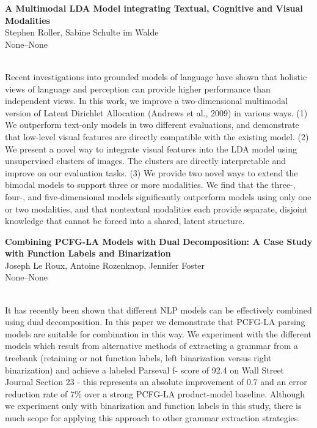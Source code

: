 \documentclass[twoside,makeidx]{book}
\renewcommand{\normalsize}{\fontsize{8}{9}\selectfont}
\renewcommand{\small}{\fontsize{7}{8}\selectfont}
\begin{document}
\par\vspace{2em}\noindent%
\begin{minipage}{\linewidth}%
\begin{center}
\textbf{\normalsize A Multimodal LDA Model integrating Textual, Cognitive and Visual Modalities}\\
\normalsize  Stephen Roller,  Sabine Schulte im Walde\\
{\small None--None}\\
\end{center}
\end{minipage}\\[0.5em]
\nopagebreak%
\noindent%
{\small Recent investigations into grounded models of language have shown that holistic views of language and perception can provide higher performance than independent views. In this work, we improve a two-dimensional multimodal version of Latent Dirichlet Allocation (Andrews et al., 2009) in various ways. (1) We outperform text-only models in two different evaluations, and demonstrate that low-level visual features are directly compatible with the existing model. (2) We present a novel way to integrate visual features into the LDA model using unsupervised clusters of images. The clusters are directly interpretable and improve on our evaluation tasks. (3) We provide two novel ways to extend the bimodal models to support three or more modalities. We find that the three-, four-, and five-dimensional models significantly outperform models using only one or two modalities, and that nontextual modalities each provide separate, disjoint knowledge that cannot be forced into a shared, latent structure.}
\par\vspace{2em}\noindent%
\begin{minipage}{\linewidth}%
\begin{center}
\textbf{\normalsize Combining PCFG-LA Models with Dual Decomposition: A Case Study with Function Labels and Binarization}\\
\normalsize  Joseph Le Roux,  Antoine Rozenknop,  Jennifer Foster\\
{\small None--None}\\
\end{center}
\end{minipage}\\[0.5em]
\nopagebreak%
\noindent%
{\small It has recently been shown that different NLP models can be effectively combined using dual decomposition. In this paper we demonstrate that PCFG-LA parsing models are suitable for combination in this way. We experiment with the different models which result from alternative methods of extracting a grammar from a treebank (retaining or not function labels, left binarization versus right binarization) and achieve a labeled Parseval f- score of 92.4 on Wall Street Journal Section 23 - this represents an absolute improvement of 0.7 and an error reduction rate of 7\% over a strong PCFG-LA product-model baseline. Although we experiment only with binarization and function labels in this study, there is much scope for applying this approach to other grammar extraction strategies.}
\end{document}
